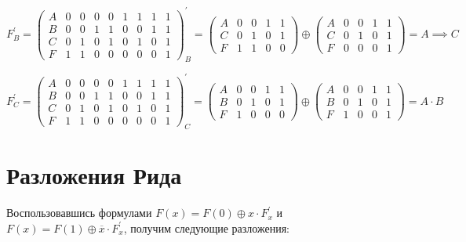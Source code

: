 \documentclass[a4paper,10pt]{article} %
\begin{document}
	\begin{equation}
		F^{\prime}_{B} = 
		\left(
		\begin{smallmatrix}
			A & 0 & 0 & 0 & 0 & 1 & 1 & 1 & 1 \\
			B & 0 & 0 & 1 & 1 & 0 & 0 & 1 & 1 \\
			C & 0 & 1 & 0 & 1 & 0 & 1 & 0 & 1 \\
			F & 1 & 1 & 0 & 0 & 0 & 0 & 0 & 1
		\end{smallmatrix}
		\right) ^ {\prime}_{B} = 
		\left(
		\begin{smallmatrix}
			A & 0 & 0 & 1 & 1 \\
			C & 0 & 1 & 0 & 1 \\
			F & 1 & 1 & 0 & 0
		\end{smallmatrix}
		\right) \oplus 
		\left( 
		\begin{smallmatrix}
			A & 0 & 0 & 1 & 1 \\
			C & 0 & 1 & 0 & 1 \\
			F & 0 & 0 & 0 & 1
		\end{smallmatrix}  
		\right) 
		= A \implies C
	\end{equation}

	\begin{equation}
		F^{\prime}_{C} = 
		\left(
		\begin{smallmatrix}
			A & 0 & 0 & 0 & 0 & 1 & 1 & 1 & 1 \\
			B & 0 & 0 & 1 & 1 & 0 & 0 & 1 & 1 \\
			C & 0 & 1 & 0 & 1 & 0 & 1 & 0 & 1 \\
			F & 1 & 1 & 0 & 0 & 0 & 0 & 0 & 1
		\end{smallmatrix}
		\right)^{\prime}_{C} =
		\left(
		\begin{smallmatrix}
			A & 0 & 0 & 1 & 1 \\
			B & 0 & 1 & 0 & 1 \\
			F & 1 & 0 & 0 & 0
		\end{smallmatrix}
		\right) \oplus
		\left(
		\begin{smallmatrix}
			A & 0 & 0 & 1 & 1 \\
			B & 0 & 1 & 0 & 1 \\
			F & 1 & 0 & 0 & 1 
		\end{smallmatrix}
		\right)
		= A \cdot B
	\end{equation}

	
	\section{Разложения Рида}
	Воспользовавшись формулами $F(x) = F(0) \oplus x \cdot F_{x}^{\prime}$ 
	и $F(x) = F(1) \oplus \overline{x} \cdot F_{x}^{\prime}$, получим следующие
	разложения:
	
\end{document}

